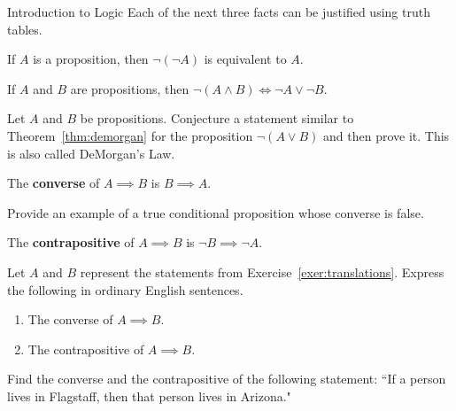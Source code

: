 \begin{section}{Introduction to Logic}
Each of the next three facts can be justified using truth tables.

\begin{theorem}
If $A$ is a proposition, then $\neg(\neg A)$ is equivalent to $A$.
\end{theorem}

\begin{theorem}\label{thm:demorgan}
If $A$ and $B$ are propositions, then $\neg(A \wedge B) \iff \neg A \vee \neg B$.
\end{theorem}

\begin{problem}
Let $A$ and $B$ be propositions.  Conjecture a statement similar to Theorem~\ref{thm:demorgan} for the proposition $\neg(A\vee B)$ and then prove it. This is also called DeMorgan's Law.
\end{problem}

\begin{definition}\label{def:converse}
The \textbf{converse} of $A \implies B$ is $B \implies A$.
\end{definition}

\begin{exercise}
Provide an example of a true conditional proposition whose converse is false.
\end{exercise}

\begin{definition}
The \textbf{contrapositive} of $A \implies B$ is $\neg B \implies \neg A$.
\end{definition}

\begin{exercise}
Let $A$ and $B$ represent the statements from Exercise~\ref{exer:translations}.  Express the following in ordinary English sentences.
\begin{enumerate}[label=\textrm{(\alph*)}]
\item The converse of $A \implies B$.
\item The contrapositive of $A \implies B$.
\end{enumerate}
\end{exercise}

\begin{exercise}
Find the converse and the contrapositive of the following statement: ``If a person lives in Flagstaff, then that person lives in Arizona."
\end{exercise}


\end{section}
